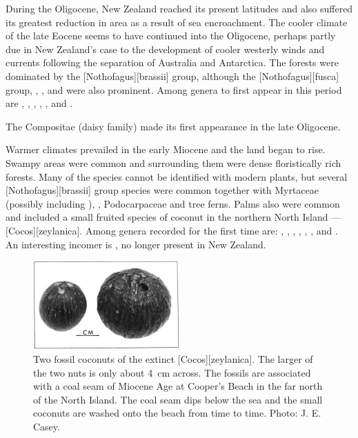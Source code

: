 During the Oligocene, New Zealand reached its present latitudes and also suffered its greatest reduction in area as a result of sea encroachment.
The cooler climate of the late Eocene seems to have continued into the Oligocene, perhaps partly due in New Zealand's case to the development of cooler westerly winds and currents following the separation of Australia and Antarctica.
The forests were dominated by the [Nothofagus][brassii] group, although the [Nothofagus][fusca] group, , ,  and  were also prominent.
Among genera to first appear in this period are , , , , ,  and .

The Compositae (daisy family) made its first appearance in the late Oligocene.

Warmer climates prevailed in the early Miocene and the land began to rise.
Swampy areas were common and surrounding them were dense floristically rich forests.
Many of the species cannot be identified with modern plants, but several [Nothofagus][brassii] group species were common together with Myrtaceae (possibly including ), , Podocarpaceae and tree ferns.
Palms also were common and included a small fruited species of coconut in the northern North Island --- [Cocos][zeylanica].
Among genera recorded for the first time are: , , , , , ,  and .
An interesting incomer is , no longer present in New Zealand.

\begin{figure}
	\includegraphics[width=0.5\textwidth]{graphics/figure124fossil-coconuts.jpg}
	\centering
	\caption[Two fossil coconuts]{Two fossil coconuts of the extinct [Cocos][zeylanica].
	The larger of the two nuts is only about \SI{4}{\centi\metre} across.
	The fossils are associated with a coal seam of Miocene Age at Cooper's Beach in the far north of the North Island.
	The coal seam dips below the sea and the small coconuts are washed onto the beach from time to time.
	Photo: J. E. Casey.}%
	\label{fig:124fossil-coconuts}
\end{figure}

